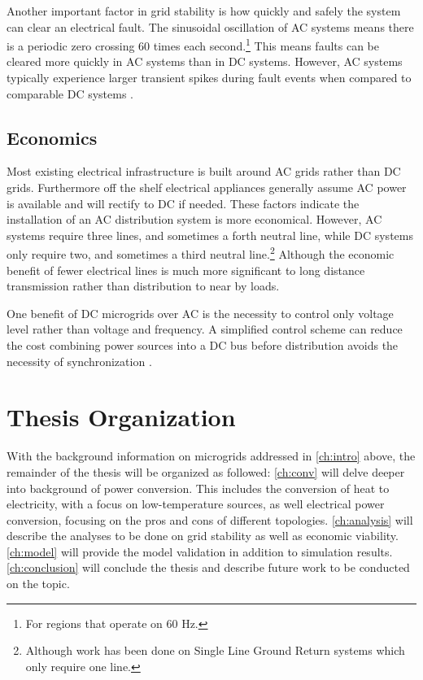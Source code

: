 Another important factor in grid stability is how quickly and safely the system can clear an electrical fault. The sinusoidal oscillation of AC systems means there is a periodic zero crossing 60 times each second.\footnote{For regions that operate on 60 Hz.} This means faults can be cleared more quickly in AC systems than in DC systems.  However, AC systems typically experience larger transient spikes during fault events when compared to comparable DC systems \cite{Estes2011}. 

\subsection{Economics}
Most existing electrical infrastructure is built around AC grids rather than DC grids. Furthermore off the shelf electrical appliances generally assume AC power is available and will rectify to DC if needed. These factors indicate the installation of an AC distribution system is more economical. However, AC systems require three lines, and sometimes a forth neutral line, while DC systems only require two, and sometimes a third neutral line.\footnote{Although work has been done on Single Line Ground Return systems which only require one line.} Although the economic benefit of fewer electrical lines is much more significant to long distance transmission rather than distribution to near by loads.

One benefit of DC microgrids over AC is the necessity to control only voltage level rather than voltage and frequency. A simplified control scheme can reduce the cost combining power sources into a DC bus before distribution avoids the necessity of synchronization \cite{Lotfi2015}.

\section{Thesis Organization}
With the background information on microgrids addressed in \autoref{ch:intro} above, the remainder of the thesis will be organized as followed: \autoref{ch:conv} will delve deeper into background of power conversion. This includes the conversion of heat to electricity, with a focus on low-temperature sources, as well electrical power conversion, focusing on the pros and cons of different topologies. 
\autoref{ch:analysis} will describe the analyses to be done on grid stability as well as economic viability. \autoref{ch:model} will provide the model validation in addition to simulation results. \autoref{ch:conclusion} will conclude the thesis and describe future work to be conducted on the topic.

